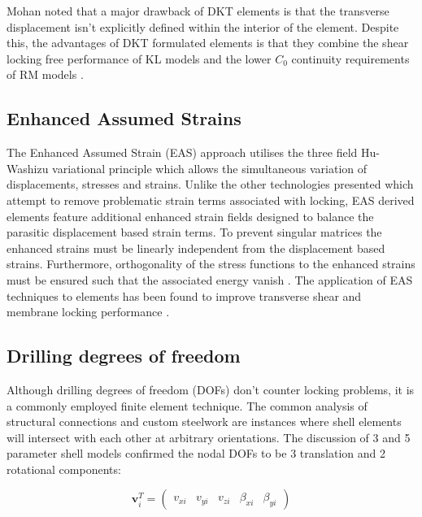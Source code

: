 Mohan \cite{Mohan97} noted that a major drawback of DKT elements is that the transverse displacement isn't explicitly defined within the interior of the element. Despite this, the advantages of DKT formulated elements is that they combine the shear locking free performance of KL models and the lower $C_0$ continuity requirements of RM models \cite{Bletz16}.

\subsection{Enhanced Assumed Strains}

The Enhanced Assumed Strain (EAS) approach \cite{Simo1990} utilises the three field Hu-Washizu variational principle which allows the simultaneous variation of displacements, stresses and strains. Unlike the other technologies presented which attempt to remove problematic strain terms associated with locking, EAS derived elements feature additional enhanced strain fields designed to balance the parasitic displacement based strain terms. To prevent singular matrices the enhanced strains must be linearly independent from the displacement based strains. Furthermore, orthogonality of the stress functions to the enhanced strains must be ensured such that the associated energy vanish \cite{Echter13}. The application of EAS techniques to elements has been found to improve transverse shear and membrane locking performance \cite{Simo1990} \cite{BischLitBook04} \cite{Echter13}.

\subsection{Drilling degrees of freedom}

Although drilling degrees of freedom (DOFs) don't counter locking problems, it is a commonly employed finite element technique. The common analysis of structural connections and custom steelwork are instances where shell elements will intersect with each other at arbitrary orientations. The discussion of 3 and 5 parameter shell models confirmed the nodal DOFs to be 3 translation and 2 rotational components:

\begin{equation} 
\mathbf{v}_i^T = \begin{pmatrix}
v_{xi} & v_{yi} & v_{zi} & \beta_{xi} & \beta_{yi}
\end{pmatrix}
\label{eqsdrilling}
\end{equation}

